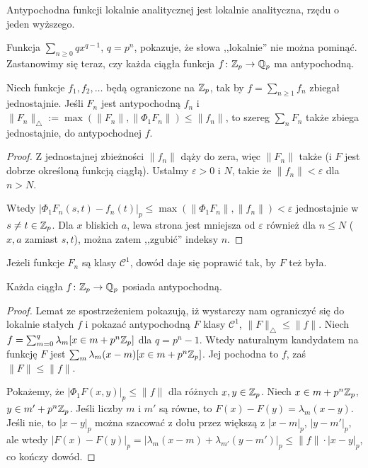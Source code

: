 \begin{fakt}
	Antypochodna funkcji lokalnie analitycznej jest lokalnie analityczna, rzędu o jeden wyższego.
\end{fakt}

Funkcja $\sum_{n \ge 0} qx^{q-1}$, $q = p^n$, pokazuje, że słowa ,,lokalnie'' nie można pominąć.
Zastanowimy się teraz, czy każda ciągła funkcja $f \colon \mathbb Z_p \to \mathbb Q_p$ ma antypochodną.

\begin{fakt}
	Niech funkcje $f_1, f_2, \ldots$ będą ograniczone na $\mathbb Z_p$, tak by $f = \sum_{n \ge 1} f_n$ zbiegał jednostajnie.
	Jeśli $F_n$ jest antypochodną $f_n$ i $\|F_n\|_\triangle := \max (\|F_n\|, \|\Phi_1 F_n\|) \le \|f_n\|$, to szereg $\sum_n F_n$ także zbiega jednostajnie, do antypochodnej $f$.
\end{fakt}

\begin{proof}
	Z jednostajnej zbieżności $\|f_n\|$ dąży do zera, więc $\|F_n\|$ także (i $F$ jest dobrze określoną funkcją ciągłą). Ustalmy $\varepsilon > 0$ i $N$, takie że $\|f_n\| <\varepsilon$ dla $n > N$.

	Wtedy $|\Phi_1 F_n(s,t) - f_n(t)|_p \le \max(\|\Phi_1 F_n\|, \|f_n\|) < \varepsilon$ jednostajnie w $s \neq  t \in \mathbb Z_p$.
	Dla $x$ bliskich $a$, lewa strona jest mniejsza od $\varepsilon$ również dla $n \le N$ ($x, a$ zamiast $s, t$), można zatem ,,zgubić'' indeksy $n$.
\end{proof}

Jeżeli funkcje $F_n$ są klasy $\mathcal C^1$, dowód daje się poprawić tak, by $F$ też była.

\begin{twierdzenie}[Dieudonné]
	Każda ciągła $f \colon \mathbb Z_p \to \mathbb Q_p$ posiada antypochodną.
\end{twierdzenie}

\begin{proof}
	Lemat ze spostrzeżeniem pokazują, iż wystarczy nam ograniczyć się do lokalnie stałych $f$ i pokazać antypochodną $F$ klasy $\mathcal C^1$, $\|F\|_\triangle \le \|f\|$.
	Niech $f = \sum_{m=0}^{q} \lambda_m [x \in m + p^n\mathbb Z_p]$ dla $q = p^n-1$.
	Wtedy naturalnym kandydatem na funkcję $F$ jest $\sum_m \lambda_m (x-m) [x \in m + p^n\mathbb Z_p]$.
	Jej pochodna to $f$, zaś $\|F\| \le \|f\|$.

	Pokażemy, że $|\Phi_1 F(x,y)|_p \le \|f\|$ dla różnych $x, y \in \mathbb Z_p$.
	Niech $x \in m + p^n\mathbb Z_p$, $y \in m' + p^n \mathbb Z_p$.
	Jeśli liczby $m$ i $m'$ są równe, to $F(x) - F(y) = \lambda_m (x - y)$.
	Jeśli nie, to $|x-y|_p$ można szacować z dołu przez większą z $|x - m|_p$, $|y - m'|_p$, ale wtedy $|F(x) - F(y)|_p = |\lambda_m(x - m) + \lambda_{m'}(y - m')|_p \le \|f\| \cdot |x -y|_p$, co kończy dowód.
\end{proof}

